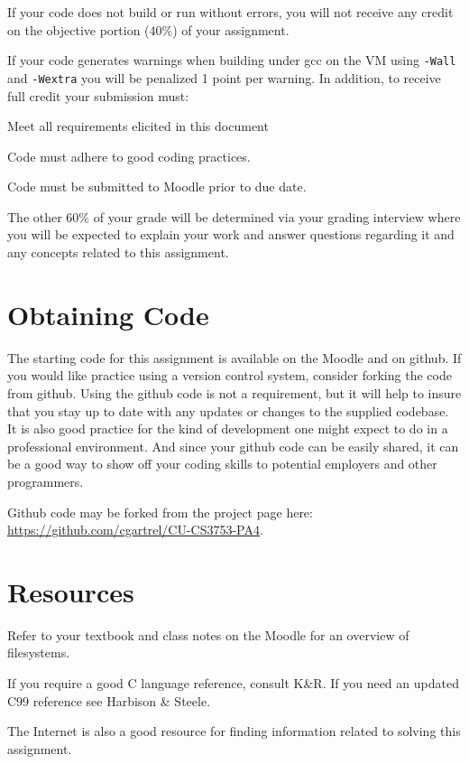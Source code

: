 \documentclass[12pt]{article}
\newenvironment{packed_item}{
\begin{itemize}
  \setlength{\itemsep}{1pt}
  \setlength{\parskip}{0pt}
  \setlength{\parsep}{0pt}
}{\end{itemize}}
\begin{document}
If your code does not build or run without errors, you will not receive
any credit on the objective portion (40\%) of your assignment.

If your code generates warnings when building under gcc on the VM
using \texttt{-Wall} and \texttt{-Wextra} you will be penalized 1
point per warning. In addition, to receive full credit your submission must:
\begin{packed_item}
\item Meet all requirements elicited in this document
\item Code must adhere to good coding practices.
\item Code must be submitted to Moodle prior to due date.
\end{packed_item}

The other 60\% of your grade will be determined via your grading
interview where you will be expected to explain your work and answer
questions regarding it and any concepts related to this assignment.

\section{Obtaining Code}
The starting code for this assignment is available on the Moodle and
on github. If you would like practice using a version control system,
consider forking the code from github. Using the github code is not
a requirement, but it will help to insure that you stay up to date
with any updates or changes to the supplied codebase. It is also
good practice for the kind of development one might expect to do in
a professional environment. And since your github code can be easily
shared, it can be a good way to show off your coding skills to
potential employers and other programmers.

Github code may be forked from the project page here:\\
\url{https://github.com/cgartrel/CU-CS3753-PA4}.

\section{Resources}
Refer to your textbook and class notes on the Moodle for an overview
of filesystems.

If you require a good C language reference, consult K\&R\cite{K+R}. If
you need an updated C99 reference see Harbison \& Steele\cite{H+S}.

The Internet\cite{tubes} is also a good resource for finding
information related to solving this assignment.
\end{document}
